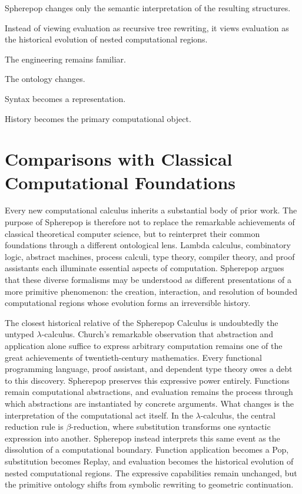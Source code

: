 \documentclass[12pt,oneside]{article}
\theoremstyle{definition}
\theoremstyle{remark}
\begin{document}
Spherepop changes only the semantic interpretation of the resulting
structures.

Instead of viewing evaluation as recursive tree rewriting, it views evaluation
as the historical evolution of nested computational regions.

The engineering remains familiar.

The ontology changes.

Syntax becomes a representation.

History becomes the primary computational object.

\section{Comparisons with Classical Computational Foundations}

Every new computational calculus inherits a substantial body of prior work.
The purpose of Spherepop is therefore not to replace the remarkable
achievements of classical theoretical computer science, but to reinterpret
their common foundations through a different ontological lens. Lambda
calculus, combinatory logic, abstract machines, process calculi, type theory,
compiler theory, and proof assistants each illuminate essential aspects of
computation. Spherepop argues that these diverse formalisms may be understood
as different presentations of a more primitive phenomenon: the creation,
interaction, and resolution of bounded computational regions whose evolution
forms an irreversible history.

The closest historical relative of the Spherepop Calculus is undoubtedly the
untyped $\lambda$-calculus. Church's remarkable observation that abstraction
and application alone suffice to express arbitrary computation remains one of
the great achievements of twentieth-century mathematics. Every functional
programming language, proof assistant, and dependent type theory owes a debt
to this discovery. Spherepop preserves this expressive power entirely.
Functions remain computational abstractions, and evaluation remains the
process through which abstractions are instantiated by concrete arguments.
What changes is the interpretation of the computational act itself. In the
$\lambda$-calculus, the central reduction rule is $\beta$-reduction, where
substitution transforms one syntactic expression into another. Spherepop
instead interprets this same event as the dissolution of a computational
boundary. Function application becomes a Pop, substitution becomes Replay, and
evaluation becomes the historical evolution of nested computational regions.
The expressive capabilities remain unchanged, but the primitive ontology shifts
from symbolic rewriting to geometric continuation.
\end{document}
